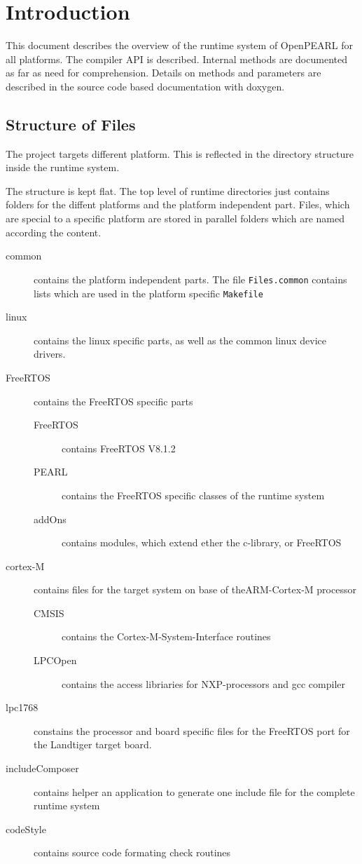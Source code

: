 \chapter{Introduction}

This document describes the overview of the runtime system
of OpenPEARL for all platforms.
The compiler API is described.
Internal methods are documented as far as need for comprehension.
Details on methods and parameters are 
described in the source code based documentation with doxygen.

\section{Structure of Files}
The project targets different platform. 
This is reflected in the directory structure inside the runtime system.

The structure is kept flat. The top level of runtime directories
just contains folders for the diffent platforms and the platform
independent part. Files, which are special to a specific platform
are stored in parallel folders which are named according the content.
\begin{description}
\item[common] contains the platform independent parts.
   The file \verb|Files.common| contains lists which are used in the
  platform specific  \verb|Makefile|
\item[linux] contains the linux specific parts, as well as the common
   linux device drivers. 
\item[FreeRTOS] contains the FreeRTOS specific parts
  \begin{description}
  \item[FreeRTOS] contains FreeRTOS V8.1.2
  \item [PEARL] contains the FreeRTOS specific classes of the runtime system
  \item[addOns] contains modules, which extend ether the c-library, or
                FreeRTOS
  \end{description}
\item[cortex-M] contains files for the target system on base of theARM-Cortex-M
   processor
   \begin{description}
   \item[CMSIS] contains the Cortex-M-System-Interface routines
   \item[LPCOpen] contains the access libriaries for NXP-processors and
              gcc compiler
   \end{description}
\item[lpc1768] constains the processor and board specific
   files for the FreeRTOS port for the Landtiger target board.
\item[includeComposer] contains helper an application to generate 
   one include file for the complete runtime system
\item[codeStyle] contains source code formating check routines
\end{description}

